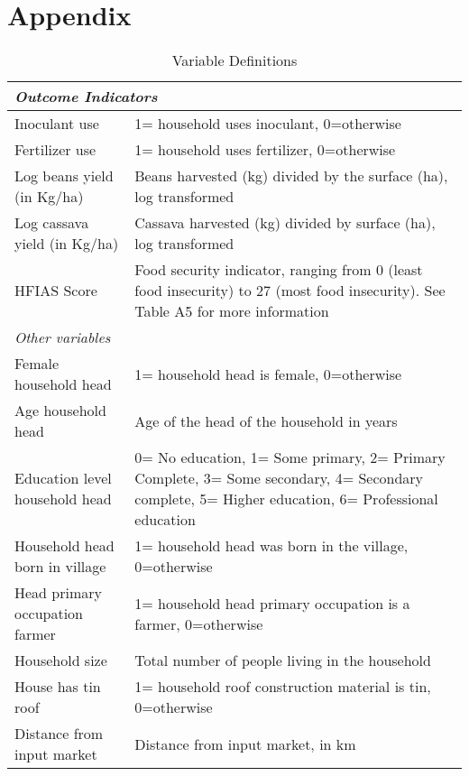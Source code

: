 \clearpage
\section{Appendix}
\setcounter{table}{0}
\renewcommand{\thetable}{\arabic{chapter}.A\arabic{table}}





\begin{table}[htbp]
	\scriptsize
	\caption{Variable Definitions}
	\label{tab:n2a_impact:vardef}
	\bgroup
	\def\arraystretch{1.3}
    \begin{tabular}{p{}p{}}
    \toprule
	
	\multicolumn{2}{l}{\textit{Outcome Indicators}}\\
	\midrule
	Inoculant use & 1= household uses inoculant, 0=otherwise\\
	Fertilizer use & 1= household uses fertilizer, 0=otherwise\\
	Log beans yield (in Kg/ha) & Beans harvested (kg) divided by the surface (ha), log transformed\\
	Log cassava yield (in Kg/ha) & Cassava harvested (kg) divided by surface (ha), log transformed\\
	HFIAS Score & Food security indicator, ranging from 0 (least food insecurity) to 27 (most food insecurity). See Table A5 for more information\\
	\multicolumn{2}{l}{\textit{Other variables}}\\
	\midrule
	Female household head & 1= household head is female, 0=otherwise\\
	Age household head  & Age of the head of the household in years \\
	Education level household head & 0= No education, 1= Some primary, 2= Primary Complete, 3= Some secondary, 4= Secondary complete, 5= Higher education, 6= Professional education\\
	Household head born in village & 1= household head was born in the village, 0=otherwise\\
	Head primary occupation farmer & 1= household head primary occupation is a farmer, 0=otherwise\\
	Household size & Total number of people living in the household\\
	House has tin roof & 1= household roof construction material is tin, 0=otherwise\\
	Distance from input market & Distance from input market, in km\\

\end{tabular}
\end{table}

